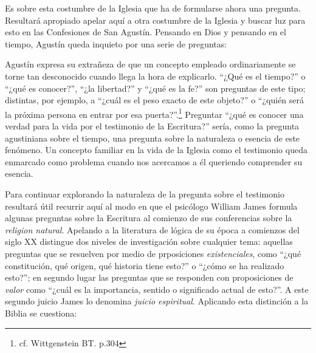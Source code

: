   Es sobre esta costumbre de la Iglesia que ha de formularse ahora una pregunta.
  Resultará apropiado apelar aquí a otra costumbre de la Iglesia y buscar luz para
  esto en las Confesiones de San Agustín. Pensando en Dios y pensando en el
  tiempo, Agustín queda inquieto por una serie de preguntas: 

  Agustín expresa su extrañeza de que un concepto empleado ordinariamente se
  torne tan desconocido cuando llega la hora de explicarlo. ``¿Qué es el
  tiempo?'' o ``¿qué es conocer?'', ``¿la libertad?'' y ``¿qué es la fe?'' son
  preguntas de este tipo; distintas, por ejemplo, a ``¿cuál es el peso exacto de
  este objeto?'' o ``¿quién será la próxima persona en entrar por esa
  puerta?''.\footnote{cf. Wittgenstein BT. p.304} Preguntar ``¿qué es conocer una
  verdad para la vida por el testimonio de la Escritura?'' sería, como la pregunta
  agustiniana sobre el tiempo, una pregunta sobre la naturaleza o esencia de
  este fenómeno. Un concepto familiar en la vida de la Iglesia como el
  testimonio queda enmarcado como problema cuando nos acercamos a él queriendo
  comprender su esencia.

  Para continuar explorando la naturaleza de la pregunta sobre el testimonio
  resultará útil recurrir aquí al modo en que el psicólogo William James formula
  algunas preguntas sobre la Escritura al comienzo de sus conferencias sobre la
  \emph{religion natural}. Apelando a la literatura de lógica de su época a
  comienzos del siglo XX distingue dos niveles de investigación sobre cualquier
  tema: aquellas preguntas que se resuelven por medio de prposiciones
  \emph{existenciales}, como ``¿qué constitución, qué origen, qué historia tiene
  esto?'' o ``¿cómo se ha realizado esto?''; en segundo lugar las preguntas que se
  responden con proposiciones de \emph{valor} como ``¿cuál es la importancia,
  sentido o significado actual de esto?''. A este segundo juicio James lo denomina
  \emph{juicio espiritual}. Aplicando esta distinción a la Biblia se cuestiona:

